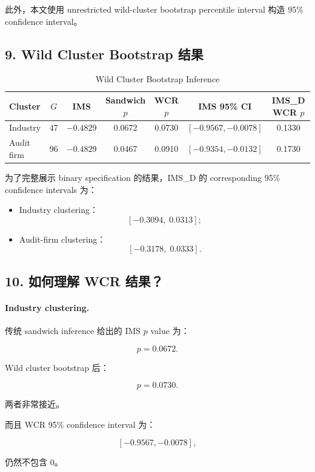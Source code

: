 \documentclass[11pt]{article}
\begin{document}
此外，本文使用 unrestricted wild-cluster bootstrap percentile interval 构造 95\% confidence interval。

\subsection{9. Wild Cluster Bootstrap 结果}

\begin{table}[htbp]
\centering
\caption{Wild Cluster Bootstrap Inference}
\begin{tabular}{lcccccc}
\toprule
Cluster & $G$ & IMS & Sandwich $p$ & WCR $p$ & IMS 95\% CI & IMS\_D WCR $p$ \\
\midrule
Industry & 47 
& $-0.4829$
& 0.0672
& 0.0730
& $[-0.9567,-0.0078]$
& 0.1330 \\
Audit firm & 96
& $-0.4829$
& 0.0467
& 0.0910
& $[-0.9354,-0.0132]$
& 0.1730 \\
\bottomrule
\end{tabular}
\end{table}

为了完整展示 binary specification 的结果，IMS\_D 的 corresponding 95\% confidence intervals 为：

\begin{itemize}
    \item Industry clustering：
    \[
    [-0.3094,\;0.0313];
    \]
    \item Audit-firm clustering：
    \[
    [-0.3178,\;0.0333].
    \]
\end{itemize}

\subsection{10. 如何理解 WCR 结果？}

\paragraph{Industry clustering.}

传统 sandwich inference 给出的 IMS $p$ value 为：

\[
p=0.0672.
\]

Wild cluster bootstrap 后：

\[
p=0.0730.
\]

两者非常接近。

而且 WCR 95\% confidence interval 为：

\[
[-0.9567,-0.0078],
\]

仍然不包含 0。
\end{document}
